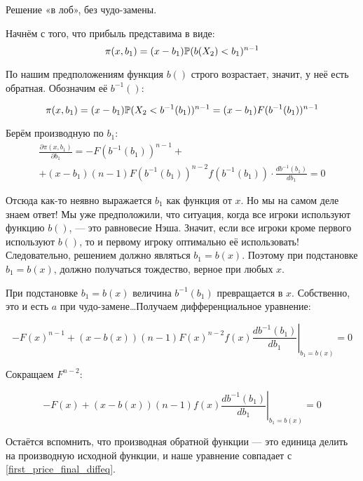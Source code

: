 \begin{enumerate}
\begin{myex} Решение «в лоб», без чудо-замены.

Начнём с того, что прибыль представима в виде:
\begin{equation}
\pi(x,b_{1})=(x-b_{1})\P(b(X_{2})<b_{1})^{n-1}
\end{equation}

По нашим предположениям функция $ b() $ строго возрастает, значит, у неё есть обратная. Обозначим её $ b^{-1}() $:

\begin{equation}
\pi(x,b_{1})=(x-b_{1})\P(X_{2}<b^{-1}(b_{1}))^{n-1}=(x-b_{1})F(b^{-1}(b_{1}))^{n-1}
\end{equation}

Берём производную по $ b_{1} $:
\begin{multline}
\frac{\partial \pi(x,b_{1})}{\partial b_{1}}=-F(b^{-1}(b_{1}))^{n-1}+\\
+(x-b_{1})(n-1)F(b^{-1}(b_{1}))^{n-2}f(b^{-1}(b_{1}))\cdot \frac{db^{-1}(b_{1})}{db_{1}}=0
\end{multline}

Отсюда как-то неявно выражается $ b_{1} $ как функция от $ x $. Но мы на самом деле знаем ответ! Мы уже предположили, что ситуация, когда все игроки используют функцию $b()$, — это равновесие Нэша. Значит, если все игроки кроме первого используют $ b() $, то и первому игроку оптимально её использовать! Следовательно, решением должно являться $b_{1}=b(x)$. Поэтому при подстановке $b_{1}=b(x)$, должно получаться тождество, верное при любых $ x $.

При подстановке $ b_{1}=b(x) $ величина $ b^{-1}(b_{1}) $ превращается в $x$. Собственно, это и есть $ a $ при чудо-замене\ldots Получаем дифференциальное уравнение:

\begin{equation}
-F(x)^{n-1}+(x-b(x))(n-1)F(x)^{n-2}f(x)\left.\frac{db^{-1}(b_{1})}{db_{1}}\right|_{b_{1}=b(x)}=0
\end{equation}

Сокращаем $ F^{n-2} $:

\begin{equation}
-F(x)+(x-b(x))(n-1)f(x)\left.\frac{db^{-1}(b_{1})}{db_{1}}\right|_{b_{1}=b(x)}=0
\end{equation}

Остаётся вспомнить, что производная обратной функции — это единица делить на производную исходной функции, и наше уравнение совпадает с \ref{first_price_final_diffeq}.
\end{myex}


\end{enumerate}
